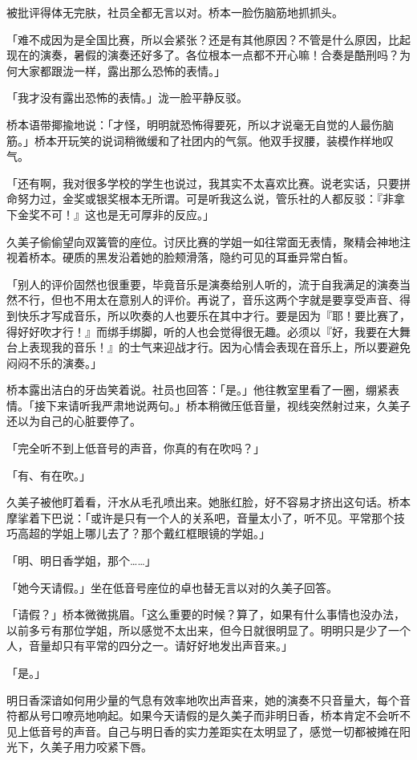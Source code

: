 \documentclass[UTF8]{ctexart}
\begin{document}
    被批评得体无完肤，社员全都无言以对。桥本一脸伤脑筋地抓抓头。 

    「难不成因为是全国比赛，所以会紧张？还是有其他原因？不管是什么原因，比起现在的演奏，暑假的演奏还好多了。各位根本一点都不开心嘛！合奏是酷刑吗？为何大家都跟泷一样，露出那么恐怖的表情。」 

    「我才没有露出恐怖的表情。」泷一脸平静反驳。 

    桥本语带揶揄地说：「才怪，明明就恐怖得要死，所以才说毫无自觉的人最伤脑筋。」桥本开玩笑的说词稍微缓和了社团内的气氛。他双手扠腰，装模作样地叹气。 

    「还有啊，我对很多学校的学生也说过，我其实不太喜欢比赛。说老实话，只要拼命努力过，金奖或银奖根本无所谓。可是听我这么说，管乐社的人都反驳：『非拿下金奖不可！』这也是无可厚非的反应。」 

    久美子偷偷望向双簧管的座位。讨厌比赛的学姐一如往常面无表情，聚精会神地注视着桥本。硬质的黑发沿着她的脸颊滑落，隐约可见的耳垂异常白皙。 

    「别人的评价固然也很重要，毕竟音乐是演奏给别人听的，流于自我满足的演奏当然不行，但也不用太在意别人的评价。再说了，音乐这两个字就是要享受声音、得到快乐才写成音乐，所以吹奏的人也要乐在其中才行。要是因为『耶！要比赛了，得好好吹才行！』而绑手绑脚，听的人也会觉得很无趣。必须以『好，我要在大舞台上表现我的音乐！』的士气来迎战才行。因为心情会表现在音乐上，所以要避免闷闷不乐的演奏。」 

    桥本露出洁白的牙齿笑着说。社员也回答：「是。」他往教室里看了一圈，绷紧表情。「接下来请听我严肃地说两句。」桥本稍微压低音量，视线突然射过来，久美子还以为自己的心脏要停了。 

    「完全听不到上低音号的声音，你真的有在吹吗？」 

    「有、有在吹。」 

    久美子被他盯着看，汗水从毛孔喷出来。她胀红脸，好不容易才挤出这句话。桥本摩挲着下巴说：「或许是只有一个人的关系吧，音量太小了，听不见。平常那个技巧高超的学姐上哪儿去了？那个戴红框眼镜的学姐。」 

    「明、明日香学姐，那个……」 

    「她今天请假。」坐在低音号座位的卓也替无言以对的久美子回答。 

    「请假？」桥本微微挑眉。「这么重要的时候？算了，如果有什么事情也没办法，以前多亏有那位学姐，所以感觉不太出来，但今日就很明显了。明明只是少了一个人，音量却只有平常的四分之一。请好好地发出声音来。」 

    「是。」 

    明日香深谙如何用少量的气息有效率地吹出声音来，她的演奏不只音量大，每个音符都从号口嘹亮地响起。如果今天请假的是久美子而非明日香，桥本肯定不会听不见上低音号的声音。自己与明日香的实力差距实在太明显了，感觉一切都被摊在阳光下，久美子用力咬紧下唇。 
\end{document}
